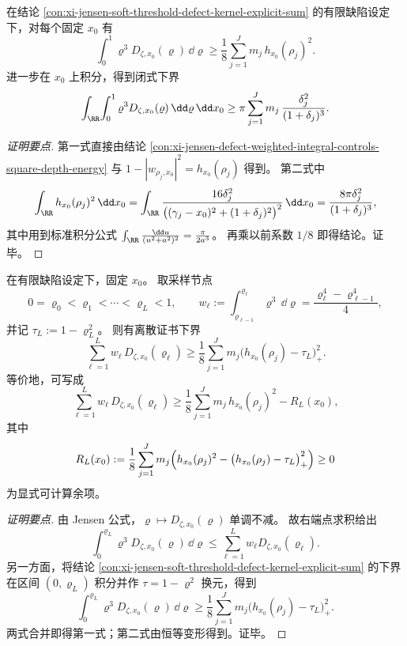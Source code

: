 \begin{conclusion}\label{con:xi-jensen-defect-second-order-tomography-closed-lower-bound}
在结论 \ref{con:xi-jensen-soft-threshold-defect-kernel-explicit-sum} 的有限缺陷设定下，对每个固定 \(x_0\) 有
\[
\int_0^1\varrho^3D_{\zeta,x_0}(\varrho)\,\dd\varrho
\ge
\frac18\sum_{j=1}^{J}m_j\,h_{x_0}(\rho_j)^2.
\]
进一步在 \(x_0\) 上积分，得到闭式下界
\[
\int_{\RR}\!\int_0^1\varrho^3D_{\zeta,x_0}(\varrho)\,\dd\varrho\,\dd x_0
\ge
\pi\sum_{j=1}^{J}m_j\,\frac{\delta_j^2}{(1+\delta_j)^3}.
\]
\end{conclusion}
\begin{proof}[证明要点]
第一式直接由结论 \ref{con:xi-jensen-defect-weighted-integral-controls-square-depth-energy}
与 \(1-|w_{\rho_j,x_0}|^2=h_{x_0}(\rho_j)\) 得到。
第二式中
\[
\int_{\RR}h_{x_0}(\rho_j)^2\,\dd x_0
=
\int_{\RR}
\frac{16\delta_j^2}{\bigl((\gamma_j-x_0)^2+(1+\delta_j)^2\bigr)^2}\,\dd x_0
=
\frac{8\pi\delta_j^2}{(1+\delta_j)^3},
\]
其中用到标准积分公式
\(
\int_{\RR}\frac{\dd u}{(u^2+a^2)^2}=\frac{\pi}{2a^3}
\)。
再乘以前系数 \(1/8\) 即得结论。证毕。
\end{proof}

\begin{conclusion}\label{con:xi-jensen-defect-finite-rho-sampling-second-order-certificate}
在有限缺陷设定下，固定 \(x_0\)。
取采样节点
\[
0=\varrho_0<\varrho_1<\cdots<\varrho_L<1,\qquad
w_\ell:=\int_{\varrho_{\ell-1}}^{\varrho_\ell}\varrho^3\,\dd\varrho
=\frac{\varrho_\ell^4-\varrho_{\ell-1}^4}{4},
\]
并记 \(\tau_L:=1-\varrho_L^2\)。
则有离散证书下界
\[
\sum_{\ell=1}^{L}w_\ell\,D_{\zeta,x_0}(\varrho_\ell)
\ge
\frac18\sum_{j=1}^{J}m_j\bigl(h_{x_0}(\rho_j)-\tau_L\bigr)_+^2.
\]
等价地，可写成
\[
\sum_{\ell=1}^{L}w_\ell\,D_{\zeta,x_0}(\varrho_\ell)
\ge
\frac18\sum_{j=1}^{J}m_j\,h_{x_0}(\rho_j)^2-R_L(x_0),
\]
其中
\[
R_L(x_0):=
\frac18\sum_{j=1}^{J}m_j
\Bigl(h_{x_0}(\rho_j)^2-\bigl(h_{x_0}(\rho_j)-\tau_L\bigr)_+^2\Bigr)\ge 0
\]
为显式可计算余项。
\end{conclusion}
\begin{proof}[证明要点]
由 Jensen 公式，\(\varrho\mapsto D_{\zeta,x_0}(\varrho)\) 单调不减。
故右端点求积给出
\[
\int_0^{\varrho_L}\varrho^3D_{\zeta,x_0}(\varrho)\,\dd\varrho
\le
\sum_{\ell=1}^{L}w_\ell D_{\zeta,x_0}(\varrho_\ell).
\]
另一方面，将结论 \ref{con:xi-jensen-soft-threshold-defect-kernel-explicit-sum} 的下界在区间 \((0,\varrho_L)\) 积分并作 \(\tau=1-\varrho^2\) 换元，得到
\[
\int_0^{\varrho_L}\varrho^3D_{\zeta,x_0}(\varrho)\,\dd\varrho
\ge
\frac18\sum_{j=1}^{J}m_j\bigl(h_{x_0}(\rho_j)-\tau_L\bigr)_+^2.
\]
两式合并即得第一式；第二式由恒等变形得到。证毕。
\end{proof}

